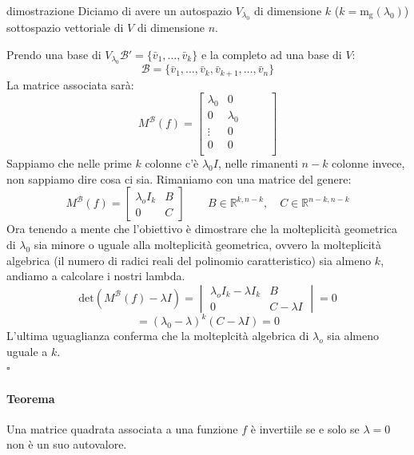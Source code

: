\documentclass[x11names]{article}
\newcommand*{\QEDB}{\null\nobreak\hfill\ensuremath{\square}}%
\begin{document}
\begin{es}{dimostrazione}
Diciamo di avere un autospazio $V_{\lambda_{0}}$ di dimensione $k$ ($k = \text{m}_{\text{g}}\left(\lambda_{0}\right)$) sottospazio vettoriale di $V$ di dimensione $n$.

\noindent
Prendo una base di $V_{\lambda_{0}} $$\mathscr{B}' = \{\bar{v}_{1},\dots,\bar{v}_{k}\}$ e la completo ad una base di $V$: 
\[
\mathscr{B} = \{\bar{v}_{1},\dots,\bar{v}_{k},\bar{v}_{k+1},\dots,\bar{v}_{n}\}
\] 
La matrice associata sarà:
\[
M^{\mathscr{B}}\left(f\right) = \begin{bmatrix}
     \lambda_{0}& 0 &  &  &\\
     0&\lambda_{0}  &  &  &\\
     \vdots& 0 &  &  &\\
     0& 0 &  &  &\\
\end{bmatrix}
\] 
Sappiamo che nelle prime $k$ colonne c'è $\lambda_{0}I$, nelle rimanenti $n-k$ colonne invece, non sappiamo dire cosa ci sia. Rimaniamo con una matrice del genere:
 \[
M^{\mathscr{B}}\left(f\right) = \begin{bmatrix}
    \lambda_{o}I_{k} & B \\
     0& C 
\end{bmatrix}
\qquad B \in \mathbb{R}^{k,n-k}, \quad C \in \mathbb{R}^{n-k,n-k}
\] 
Ora tenendo a mente che l'obiettivo è dimostrare che la molteplicità geometrica di $\lambda_{0}$ sia minore o uguale alla molteplicità geometrica, ovvero la molteplicità algebrica (il numero di radici reali del polinomio caratteristico) sia almeno $k$, andiamo a calcolare i nostri lambda.
\[
	 \text{det}\left(M^{\mathscr{B}}\left(f\right) - \lambda I\right) = 
	 \begin{vmatrix}
	\lambda_{o}I_{k} - \lambda I_{k} & B \\
     	0& C - \lambda I 
	\end{vmatrix} = 0
\] 
\[
= \left(\lambda_{0} - \lambda\right)^{k}\left(C-\lambda I\right) = 0
\] 
L'ultima uguaglianza conferma che la molteplcità algebrica di $\lambda_{o}$ sia almeno uguale a $k$.
\\
\QEDB
\end{es}



\paragraph{Teorema}
Una matrice quadrata associata a una funzione $f$ è invertiile se e solo se $\lambda = 0$ non è un suo autovalore. 
\end{document}
